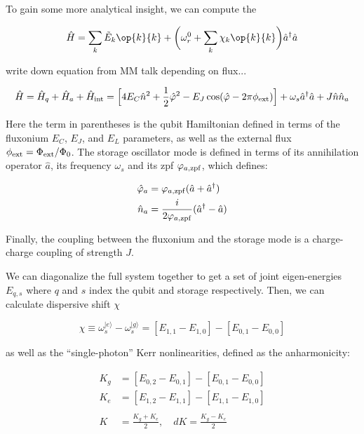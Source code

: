 To gain some more analytical insight, we can compute the 







\begin{equation}
    \hat{H} = \sum_k \tilde{E}_k \op{k}{k} + \bigg(\omega_r^0 + \sum_k \chi_k \op{k}{k}\bigg) \hat{a}^\dagger\hat{a}
\end{equation}



write down equation from MM talk depending on flux... 



$$
\hat{H} = \hat{H}_q + \hat{H}_a + \hat{H}_{\rm int} = \Big[4E_C \hat{n}^2 + \frac{1}{2}\hat{\varphi}^2 - E_J\cos(\hat{\varphi}-2\pi\phi_{\rm ext})\Big] + \omega_s \hat{a}^\dagger \hat{a} + J \hat{n}\hat{n}_a
$$

Here the term in parentheses is the qubit Hamiltonian defined in terms of the fluxonium $E_C$, $E_J$, and $E_L$ parameters, as well as the external flux $\phi_{\rm ext} = \Phi_{\rm ext}/\Phi_0$. The storage oscillator mode is defined in terms of its annihilation operator $\hat{a}$, its frequency $\omega_s$ and its zpf $\varphi_{a, \rm zpf}$, which defines:

\begin{align*}
\hat{\varphi}_a &= \varphi_{a, \rm zpf} (\hat{a}+\hat{a}^\dagger) \\
\hat{n}_a &= \frac{i}{2\varphi_{a, \rm zpf}} (\hat{a}^\dagger - \hat{a})
\end{align*}

Finally, the coupling between the fluxonium and the storage mode is a charge-charge coupling of strength $J$.

We can diagonalize the full system together to get a set of joint eigen-energies $E_{q, s}$ where $q$ and $s$ index the qubit and storage respectively. Then, we can calculate dispersive shift $\chi$

$$
\chi \equiv \omega_s^{|e\rangle} - \omega_s^{|g\rangle} = [E_{1,1} - E_{1, 0}] - [E_{0, 1} - E_{0, 0}] 
$$

as well as the “single-photon” Kerr nonlinearities, defined as the anharmonicity:

\begin{align*}
K_g &= [E_{0, 2} - E_{0, 1}] - [E_{0, 1} - E_{0, 0}] \\
K_e &= [E_{1, 2} - E_{1, 1}] - [E_{1, 1} - E_{1, 0}]
\\ \\
K &= \frac{K_g + K_e}{2}, \quad dK = \frac{K_g - K_e}{2}
\end{align*}

